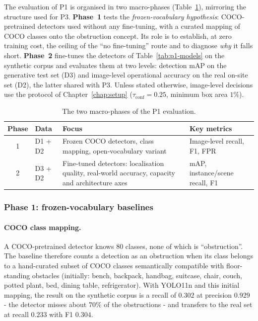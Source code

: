 The evaluation of P1 is organised in two macro-phases (Table~\ref{tab:p1-phases}),
mirroring the structure used for P3. \textbf{Phase~1} tests the
\emph{frozen-vocabulary hypothesis}: COCO-pretrained detectors used without any
fine-tuning, with a curated mapping of COCO classes onto the obstruction
concept. Its role is to establish, at zero training cost, the ceiling of the
``no fine-tuning'' route and to diagnose \emph{why} it falls short.
\textbf{Phase~2} fine-tunes the detectors of Table~\ref{tab:p1-models} on the
synthetic corpus and evaluates them at two levels: detection mAP on the
generative test set (D3) and image-level operational accuracy on the real
on-site set (D2), the latter shared with P3. Unless stated otherwise,
image-level decisions use the protocol of Chapter~\ref{chap:setup}
($\tau_{\mathrm{conf}} = 0.25$, minimum box area $1\%$).

\begin{table}[h]
  \centering
  \begin{tabular}{c l p{4.3cm} p{3.2cm}}
    \hline
    Phase & Data & Focus & Key metrics \\
    \hline
    1 & D1 + D2 & Frozen COCO detectors, class mapping, open-vocabulary variant & Image-level recall, F1, FPR \\
    2 & D3 + D2 & Fine-tuned detectors: localisation quality, real-world accuracy, capacity and architecture axes & mAP, instance/scene recall, F1 \\
    \hline
  \end{tabular}
  \caption{The two macro-phases of the P1 evaluation.}
  \label{tab:p1-phases}
\end{table}

\subsubsection{Phase 1: frozen-vocabulary baselines}

\paragraph{COCO class mapping.} A COCO-pretrained detector knows $80$ classes,
none of which is ``obstruction''. The baseline therefore counts a detection as
an obstruction when its class belongs to a hand-curated subset of COCO classes
semantically compatible with floor-standing obstacles (initially: bench,
backpack, handbag, suitcase, chair, couch, potted plant, bed, dining table,
refrigerator). With YOLO11n and this initial mapping, the result on the
synthetic corpus is a recall of $0.302$ at precision $0.929$ - the detector
misses about $70\%$ of the obstructions - and transfers to the real set at
recall $0.233$ with F1 $0.304$.

